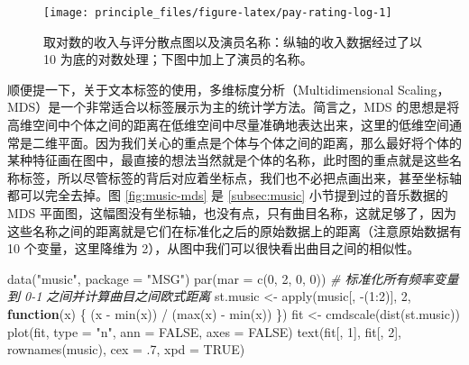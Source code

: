 \documentclass[
  b5paper,
  UTF8,twoside]{book}
\newenvironment{Shaded}{\begin{snugshade}}{\end{snugshade}}
\newcommand{\AttributeTok}[1]{\textcolor[rgb]{0.77,0.63,0.00}{#1}}
\newcommand{\CommentTok}[1]{\textcolor[rgb]{0.56,0.35,0.01}{\textit{#1}}}
\newcommand{\ConstantTok}[1]{\textcolor[rgb]{0.00,0.00,0.00}{#1}}
\newcommand{\ControlFlowTok}[1]{\textcolor[rgb]{0.13,0.29,0.53}{\textbf{#1}}}
\newcommand{\DecValTok}[1]{\textcolor[rgb]{0.00,0.00,0.81}{#1}}
\newcommand{\FunctionTok}[1]{\textcolor[rgb]{0.00,0.00,0.00}{#1}}
\newcommand{\NormalTok}[1]{#1}
\newcommand{\OtherTok}[1]{\textcolor[rgb]{0.56,0.35,0.01}{#1}}
\newcommand{\SpecialCharTok}[1]{\textcolor[rgb]{0.00,0.00,0.00}{#1}}
\newcommand{\StringTok}[1]{\textcolor[rgb]{0.31,0.60,0.02}{#1}}
\begin{document}
\begin{figure}

{\centering \texttt{[image: principle\_files/figure-latex/pay-rating-log-1]} 

}

\caption[ 取对数的收入与评分散点图以及演员名称 ]{取对数的收入与评分散点图以及演员名称：纵轴的收入数据经过了以 10 为底的对数处理；下图中加上了演员的名称。}\label{fig:pay-rating-log}
\end{figure}



顺便提一下，关于文本标签的使用，多维标度分析（Multidimensional Scaling，MDS）是一个非常适合以标签展示为主的统计学方法。简言之，MDS 的思想是将高维空间中个体之间的距离在低维空间中尽量准确地表达出来，这里的低维空间通常是二维平面。因为我们关心的重点是个体与个体之间的距离，那么最好将个体的某种特征画在图中，最直接的想法当然就是个体的名称，此时图的重点就是这些名称标签，所以尽管标签的背后对应着坐标点，我们也不必把点画出来，甚至坐标轴都可以完全去掉。图 \ref{fig:music-mds} 是 \ref{subsec:music} 小节提到过的音乐数据的 MDS 平面图，这幅图没有坐标轴，也没有点，只有曲目名称，这就足够了，因为这些名称之间的距离就是它们在标准化之后的原始数据上的距离（注意原始数据有 10 个变量，这里降维为 2），从图中我们可以很快看出曲目之间的相似性。

\begin{Shaded}
\begin{Highlighting}[]
\FunctionTok{data}\NormalTok{(}\StringTok{"music"}\NormalTok{, }\AttributeTok{package =} \StringTok{"MSG"}\NormalTok{)}
\FunctionTok{par}\NormalTok{(}\AttributeTok{mar =} \FunctionTok{c}\NormalTok{(}\DecValTok{0}\NormalTok{, }\DecValTok{2}\NormalTok{, }\DecValTok{0}\NormalTok{, }\DecValTok{0}\NormalTok{))}
\CommentTok{\# 标准化所有频率变量到 0{-}1 之间并计算曲目之间欧式距离}
\NormalTok{st.music }\OtherTok{\textless{}{-}} \FunctionTok{apply}\NormalTok{(music[, }\SpecialCharTok{{-}}\NormalTok{(}\DecValTok{1}\SpecialCharTok{:}\DecValTok{2}\NormalTok{)], }\DecValTok{2}\NormalTok{, }\ControlFlowTok{function}\NormalTok{(x) \{}
\NormalTok{  (x }\SpecialCharTok{{-}} \FunctionTok{min}\NormalTok{(x)) }\SpecialCharTok{/}\NormalTok{ (}\FunctionTok{max}\NormalTok{(x) }\SpecialCharTok{{-}} \FunctionTok{min}\NormalTok{(x))}
\NormalTok{\})}
\NormalTok{fit }\OtherTok{\textless{}{-}} \FunctionTok{cmdscale}\NormalTok{(}\FunctionTok{dist}\NormalTok{(st.music))}
\FunctionTok{plot}\NormalTok{(fit, }\AttributeTok{type =} \StringTok{"n"}\NormalTok{, }\AttributeTok{ann =} \ConstantTok{FALSE}\NormalTok{, }\AttributeTok{axes =} \ConstantTok{FALSE}\NormalTok{)}
\FunctionTok{text}\NormalTok{(fit[, }\DecValTok{1}\NormalTok{], fit[, }\DecValTok{2}\NormalTok{], }\FunctionTok{rownames}\NormalTok{(music), }\AttributeTok{cex =}\NormalTok{ .}\DecValTok{7}\NormalTok{, }\AttributeTok{xpd =} \ConstantTok{TRUE}\NormalTok{)}
\end{Highlighting}
\end{Shaded}
\end{document}
